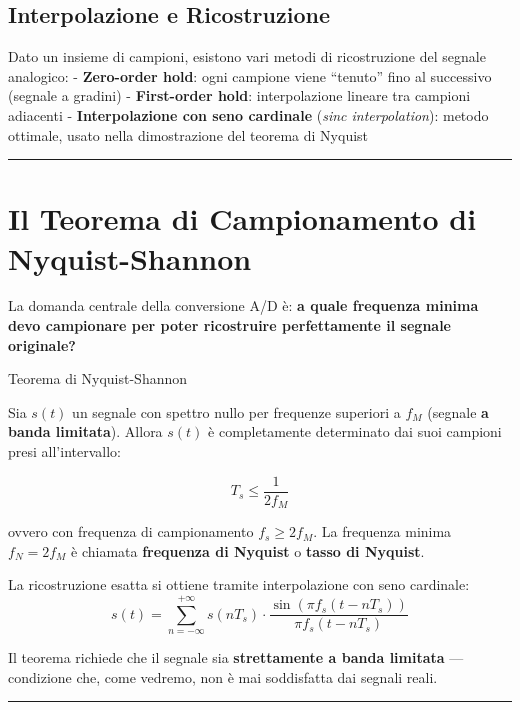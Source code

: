 \documentclass[
  italian,
  openany]{book}
\begin{document}
\subsection{Interpolazione e
Ricostruzione}\label{interpolazione-e-ricostruzione}

Dato un insieme di campioni, esistono vari metodi di ricostruzione del
segnale analogico: - \textbf{Zero-order hold}: ogni campione viene
``tenuto'' fino al successivo (segnale a gradini) - \textbf{First-order
hold}: interpolazione lineare tra campioni adiacenti -
\textbf{Interpolazione con seno cardinale} (\emph{sinc interpolation}):
metodo ottimale, usato nella dimostrazione del teorema di Nyquist

\begin{center}\rule{0.5\linewidth}{0.5pt}\end{center}

\section{Il Teorema di Campionamento di
Nyquist-Shannon}\label{il-teorema-di-campionamento-di-nyquist-shannon}

La domanda centrale della conversione A/D è: \textbf{a quale frequenza
minima devo campionare per poter ricostruire perfettamente il segnale
originale?}

\begin{callouttheorem}{Teorema di Nyquist-Shannon}

Sia \(s(t)\) un segnale con spettro nullo per frequenze superiori a
\(f_M\) (segnale \textbf{a banda limitata}). Allora \(s(t)\) è
completamente determinato dai suoi campioni presi all'intervallo:

\[T_s \leq \frac{1}{2f_M}\]

ovvero con frequenza di campionamento \(f_s \geq 2f_M\). La frequenza
minima \(f_N = 2f_M\) è chiamata \textbf{frequenza di Nyquist} o
\textbf{tasso di Nyquist}.

La ricostruzione esatta si ottiene tramite interpolazione con seno
cardinale:
\[s(t) = \sum_{n=-\infty}^{+\infty} s(nT_s) \cdot \frac{\sin(\pi f_s (t - nT_s))}{\pi f_s (t - nT_s)}\]

\end{callouttheorem}

Il teorema richiede che il segnale sia \textbf{strettamente a banda
limitata} --- condizione che, come vedremo, non è mai soddisfatta dai
segnali reali.

\begin{center}\rule{0.5\linewidth}{0.5pt}\end{center}
\end{document}
